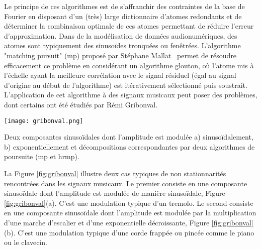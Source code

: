 Le principe de ces algorithmes est de s'affranchir des contraintes de la base de Fourier en disposant d'un (très) large dictionnaire d'atomes redondants et de déterminer la combinaison optimale de ces atomes permettant de réduire l'erreur d'approximation. Dans de la modélisation de données audionumériques, des atomes sont typiquement des sinusoïdes tronquées ou fenêtrées. L'algorithme "matching pursuit" (mp) proposé par Stéphane Mallat~\cite{mallat1993matching} permet de résoudre efficacement ce problème en considérant un algorithme glouton, où l'atome mis à l'échelle ayant la meilleure corrélation avec le signal résiduel (égal au signal d'origine au début de l'algorithme) est itérativement sélectionné puis soustrait. L'application de cet algorithme à des signaux musicaux peut poser des problèmes, dont certains ont été étudiés par Rémi Gribonval.~\cite{gribonval1996sound} %

\begin{marginfigure}
  \texttt{[image: gribonval.png]}
  \caption{Deux composantes sinusoïdales dont l'amplitude est modulée a) sinusoïdalement, b) exponentiellement et décompositions correspondantes par deux algorithmes de poursuite (mp et hrmp).}
  \label{fig:gribonval}
\end{marginfigure}

La Figure \ref{fig:gribonval} illustre deux cas typiques de non stationnarités rencontrées dans les signaux musicaux. Le premier consiste en une composante sinusoïdale dont l'amplitude est modulée de manière sinusoïdale, Figure \ref{fig:gribonval}(a). C'est une modulation typique d'un tremolo. Le second consiste en une composante sinusoïdale dont l'amplitude est modulée par la multiplication d'une marche d'escalier et d'une exponentielle décroissante, Figure \ref{fig:gribonval}(b). C'est une modulation typique d'une corde frappée ou pincée comme le piano ou le clavecin.

